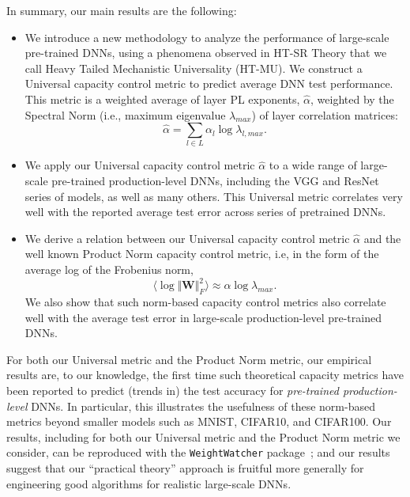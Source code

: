 In summary, our main results are the following:
\begin{itemize}
\item
We introduce a new methodology to analyze the performance of large-scale pre-trained DNNs, using a phenomena observed in HT-SR Theory that we call Heavy Tailed Mechanistic Universality (HT-MU).
We construct a Universal capacity control metric to predict average DNN test performance.
This metric is a weighted average of layer PL exponents, $\hat{\alpha}$, weighted by the Spectral Norm (i.e., maximum eigenvalue $\lambda_{max}$) of layer correlation matrices: 
$$
\hat{\alpha}=\sum_{l\in L}\alpha_{l}\log\lambda_{l,max}  .
$$
\item
We apply our Universal capacity control metric $\hat{\alpha}$ to a wide range of large-scale pre-trained production-level DNNs, including the VGG and ResNet series of models, as well as many others.
This Universal metric correlates very well with the reported average test error across series of pretrained DNNs.
\item
We derive a relation between our Universal capacity control metric $\hat{\alpha}$ and the well known Product Norm capacity control metric, i.e, in the form of the average log of the Frobenius norm,
$$
\langle\log\Vert\mathbf{W}\Vert^{2}_{F}\rangle\approx \alpha\log\lambda_{max}  .
$$
We also show that
such norm-based capacity control metrics also correlate well with the average test error in large-scale production-level pre-trained DNNs.
\end{itemize}


For both our Universal metric and the Product Norm metric, our empirical results are, to our knowledge, the first time such theoretical capacity metrics have been reported to predict (trends in) the test accuracy for \emph{pre-trained production-level} DNNs.
In particular, this illustrates the usefulness of these norm-based metrics beyond smaller models such as MNIST, CIFAR10, and CIFAR100. 
Our 
results, including for both our Universal metric and the Product Norm metric we consider, can be reproduced with the \texttt{WeightWatcher} package~\cite{weightwatcher_pagkage}; and our
results suggest that our ``practical theory'' approach is fruitful more generally for engineering good algorithms for realistic large-scale DNNs.


